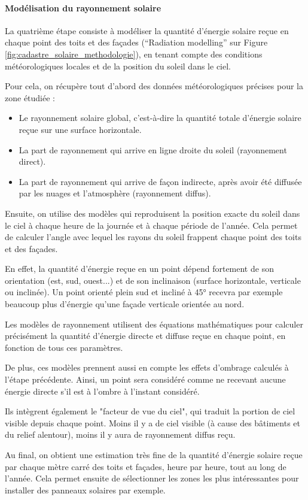 \paragraph{Modélisation du rayonnement solaire}
\par{La quatrième étape consiste à modéliser la quantité d'énergie solaire reçue en chaque point des toits et des façades (``Radiation modelling'' sur Figure \ref{fig:cadastre_solaire_methodologie}), en tenant compte des conditions météorologiques locales et de la position du soleil dans le ciel.}
\par{Pour cela, on récupère tout d'abord des données météorologiques précises pour la zone étudiée :
\begin{itemize}
    \item Le rayonnement solaire global, c'est-à-dire la quantité totale d'énergie solaire reçue sur une surface horizontale.
    \item La part de rayonnement qui arrive en ligne droite du soleil (rayonnement direct).
    \item La part de rayonnement qui arrive de façon indirecte, après avoir été diffusée par les nuages et l'atmosphère (rayonnement diffus).
\end{itemize}}
\par{Ensuite, on utilise des modèles qui reproduisent la position exacte du soleil dans le ciel à chaque heure de la journée et à chaque période de l'année. Cela permet de calculer l'angle avec lequel les rayons du soleil frappent chaque point des toits et des façades.}
\par{En effet, la quantité d'énergie reçue en un point dépend fortement de son orientation (est, sud, ouest...) et de son inclinaison (surface horizontale, verticale ou inclinée). Un point orienté plein sud et incliné à 45° recevra par exemple beaucoup plus d'énergie qu'une façade verticale orientée au nord.}
\par{Les modèles de rayonnement utilisent des équations mathématiques pour calculer précisément la quantité d'énergie directe et diffuse reçue en chaque point, en fonction de tous ces paramètres.}
\par{De plus, ces modèles prennent aussi en compte les effets d'ombrage calculés à l'étape précédente. Ainsi, un point sera considéré comme ne recevant aucune énergie directe s'il est à l'ombre à l'instant considéré.}
\par{Ils intègrent également le "facteur de vue du ciel", qui traduit la portion de ciel visible depuis chaque point. Moins il y a de ciel visible (à cause des bâtiments et du relief alentour), moins il y aura de rayonnement diffus reçu.}
\par{Au final, on obtient une estimation très fine de la quantité d'énergie solaire reçue par chaque mètre carré des toits et façades, heure par heure, tout au long de l'année. Cela permet ensuite de sélectionner les zones les plus intéressantes pour installer des panneaux solaires par exemple.}

